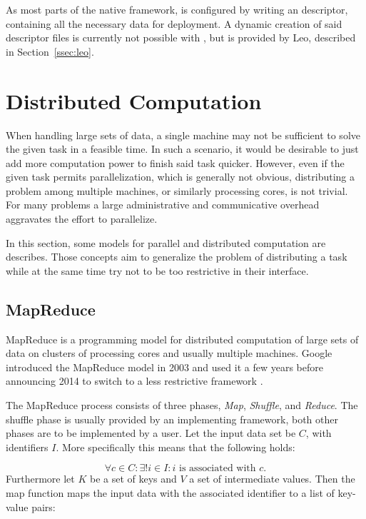 As most parts of the native \uima{} framework, \uimaas{} is configured by writing an \xml{} descriptor, containing all the necessary data for deployment. A dynamic creation of said descriptor files is currently not possible with \uimafit{}, but is provided by Leo, described in Section~\ref{ssec:leo}.

\section{Distributed Computation}
\label{sec:dist_comp}
When handling large sets of data, a single machine may not be sufficient to solve the given task in a feasible time. In such a scenario, it would be desirable to just add more computation power to finish said task quicker. However, even if the given task permits parallelization, which is generally not obvious, distributing a problem among multiple machines, or similarly processing cores, is not trivial. For many problems a large administrative and communicative overhead aggravates the effort to parallelize.

In this section, some models for parallel and distributed computation are describes. Those concepts aim to generalize the problem of distributing a task while at the same time try not to be too restrictive in their interface. 

\subsection{MapReduce}
MapReduce is a programming model for distributed computation of large sets of data on clusters of processing cores and usually multiple machines. Google introduced the MapReduce model in 2003 and used it a few years before announcing 2014 to switch to a less restrictive framework \cite{dean2008mapreduce}.

The MapReduce process consists of three phases, \emph{Map}, \emph{Shuffle}, and \emph{Reduce}. The shuffle phase is usually provided by an implementing framework, both other phases are to be implemented by a user. Let the input data set be $C$, with identifiers $I$. More specifically this means that the following holds:

\[\forall{}c\in{}C:\exists!{}i\in{}I:i\text{ is associated with }c.\]
Furthermore let $K$ be a set of keys and $V$ a set of intermediate values. Then the map function maps the input data with the associated identifier to a list of key-value pairs:

